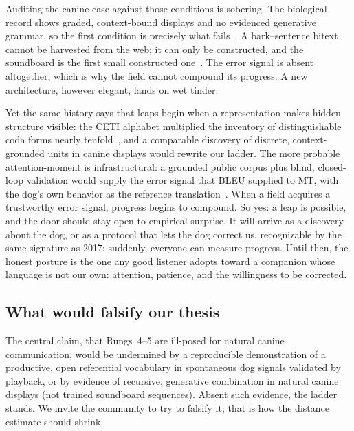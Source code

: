 Auditing the canine case against those conditions is sobering. The
biological record shows graded, context-bound displays and no evidenced
generative grammar, so the first condition is precisely what
fails~\cite{pongracz2005barks,farago2017growls}. A bark--sentence bitext
cannot be harvested from the web; it can only be constructed, and the
soundboard is the first small constructed one~\cite{bastos2024plos}. The
error signal is absent altogether, which is why the field cannot compound
its progress. A new architecture, however elegant, lands on wet tinder.

Yet the same history says that leaps begin when a representation makes
hidden structure visible: the CETI alphabet multiplied the inventory of
distinguishable coda forms nearly tenfold~\cite{sharma2024whale}, and a
comparable discovery of discrete, context-grounded units in canine displays
would rewrite our ladder. The more probable attention-moment is
infrastructural: a grounded public corpus plus blind, closed-loop
validation would supply the error signal that BLEU supplied to MT, with the
dog's own behavior as the reference
translation~\cite{bastos2024scirep,google2025dolphingemma}. When a field
acquires a trustworthy error signal, progress begins to compound. So yes: a
leap is possible, and the door should stay open to empirical surprise. It
will arrive as a discovery about the dog, or as a protocol that lets the dog
correct us, recognizable by the same signature as 2017: suddenly, everyone
can measure progress. Until then, the honest posture is the one any good
listener adopts toward a companion whose language is not our own:
attention, patience, and the willingness to be corrected.

\subsection{What would falsify our thesis}
The central claim, that Rungs~4--5 are ill-posed for natural canine
communication, would be undermined by a reproducible demonstration of a
productive, open referential vocabulary in spontaneous dog signals
validated by playback, or by evidence of recursive, generative combination
in natural canine displays (not trained soundboard sequences). Absent such
evidence, the ladder stands. We invite the community to try to falsify it;
that is how the distance estimate should shrink.

